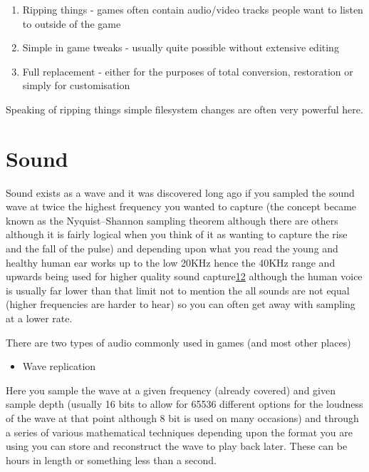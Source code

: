 \documentclass[
]{book}
\providecommand{\tightlist}{%
  \setlength{\itemsep}{0pt}\setlength{\parskip}{0pt}}
\begin{document}
\begin{enumerate}
\def\labelenumi{\arabic{enumi}.}
\tightlist
\item
  Ripping things - games often contain audio/video tracks people want to listen to outside of the game
\item
  Simple in game tweaks - usually quite possible without extensive editing
\item
  Full replacement - either for the purposes of total conversion, restoration or simply for customisation
\end{enumerate}

Speaking of ripping things simple filesystem changes are often very powerful here.

\hypertarget{sound}{%
\section{Sound}\label{sound}}

Sound exists as a wave and it was discovered long ago if you sampled the sound wave at twice the highest frequency you wanted to capture (the concept became known as the Nyquist--Shannon sampling theorem although there are others although it is fairly logical when you think of it as wanting to capture the rise and the fall of the pulse) and depending upon what you read the young and healthy human ear works up to the low 20KHz hence the 40KHz range and upwards being used for higher quality sound capture\href{romhacking202013.html\#fn12x0}{12} although the human voice is usually far lower than that limit not to mention the all sounds are not equal (higher frequencies are harder to hear) so you can often get away with sampling at a lower rate.

There are two types of audio commonly used in games (and most other places)

\begin{itemize}
\tightlist
\item
  Wave replication
\end{itemize}

Here you sample the wave at a given frequency (already covered) and given sample depth (usually 16 bits to allow for 65536 different options for the loudness of the wave at that point although 8 bit is used on many occasions) and through a series of various mathematical techniques depending upon the format you are using you can store and reconstruct the wave to play back later. These can be hours in length or something less than a second.
\end{document}
